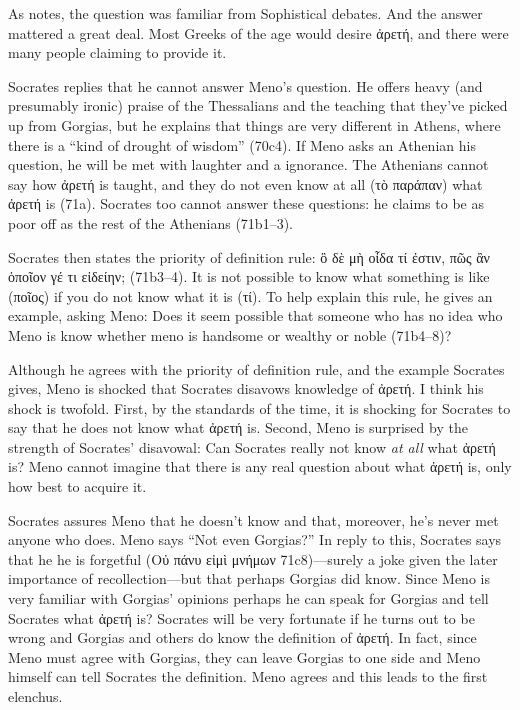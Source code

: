 \documentclass[11pt]{article}
\begin{document}
As \citet[4]{nehamas1985} notes, the question was familiar from Sophistical debates. And the answer mattered a great deal. Most Greeks of the age would desire {\g ἀρετή}, and there were many people claiming to provide it.

Socrates replies that he cannot answer Meno's question. He offers heavy (and presumably ironic) praise of the Thessalians and the teaching that they've picked up from Gorgias, but he explains that things are very different in Athens, where there is a ``kind of drought of wisdom'' (70c4). If Meno asks an Athenian his question, he will be met with laughter and a ignorance. The Athenians cannot say how ἀρετή is taught, and they do not even know at all ({\g τὸ παράπαν}) what {\g ἀρετή} is (71a). Socrates too cannot answer these questions: he claims to be as poor off as the rest of the Athenians (71b1--3). 

Socrates then states the priority of definition rule: {\g ὃ δὲ μὴ οἶδα τί ἐστιν, πῶς ἂν ὁποῖον γέ τι εἰδείην;} (71b3--4). It is not possible to know what something is like ({\g ποῖος}) if you do not know what it is ({\g τί}). To help explain this rule, he gives an example, asking Meno: Does it seem possible that someone who has no idea who Meno is know whether meno is handsome or wealthy or noble (71b4--8)?

Although he agrees with the priority of definition rule, and the example Socrates gives, Meno is shocked that Socrates disavows knowledge of {\g ἀρετή}. I think his shock is twofold. First, by the standards of the time, it is shocking for Socrates to say that he does not know what {\g ἀρετή} is. Second, Meno is surprised by the strength of Socrates' disavowal: Can Socrates really not know \emph{at all} what {\g ἀρετή} is? Meno cannot imagine that there is any real question about what {\g ἀρετή} is, only how best to acquire it.

Socrates assures Meno that he doesn't know and that, moreover, he's never met anyone who does. Meno says ``Not even Gorgias?'' In reply to this, Socrates says that he he is forgetful ({\g Οὐ πάνυ εἰμὶ μνήμων} 71c8)---surely a joke given the later importance of recollection—but that perhaps Gorgias did know. Since Meno is very familiar with Gorgias' opinions perhaps he can speak for Gorgias and tell Socrates what {\g ἀρετή} is? Socrates will be very fortunate if he turns out to be wrong and Gorgias and others do know the definition of {\g ἀρετή}. In fact, since Meno must agree with Gorgias, they can leave Gorgias to one side and Meno himself can tell Socrates the definition. Meno agrees and this leads to the first elenchus.
\end{document}
